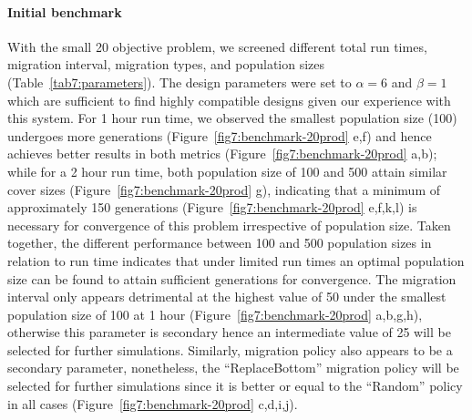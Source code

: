 \paragraph{Initial benchmark}
With the small 20 objective problem, we screened different total run times, migration interval, migration types, and population sizes (Table~\ref{tab7:parameters}). The design parameters were set to $\alpha=6$ and $\beta=1$ which are sufficient to find highly compatible designs given our experience with this system.\citep{garcia2019d}
For 1 hour run time, we observed the smallest population size (100) undergoes more generations (Figure~\ref{fig7:benchmark-20prod} e,f) and hence achieves better results in both metrics (Figure~\ref{fig7:benchmark-20prod} a,b); while for a 2 hour run time, both population size of 100 and 500 attain similar cover sizes (Figure~\ref{fig7:benchmark-20prod} g), indicating that a minimum of approximately 150 generations (Figure~\ref{fig7:benchmark-20prod} e,f,k,l) is necessary for convergence of this problem irrespective of population size.
Taken together, the different performance between 100 and 500 population sizes in relation to run time indicates that under limited run times an optimal population size can be found to attain sufficient generations for convergence.
The migration interval only appears detrimental at the highest value of 50 under the smallest population size of 100 at 1 hour (Figure~\ref{fig7:benchmark-20prod} a,b,g,h), otherwise this parameter is secondary hence an intermediate value of 25 will be selected for further simulations. Similarly, migration policy also appears to be a secondary parameter, nonetheless, the ``ReplaceBottom'' migration policy will be selected for further simulations since it is better or equal to the ``Random'' policy in all cases (Figure~\ref{fig7:benchmark-20prod} c,d,i,j).

